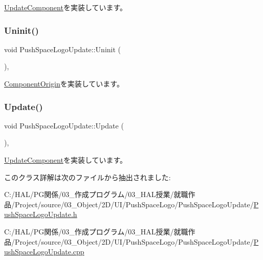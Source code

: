 \mbox{\hyperlink{class_update_component_aecc61593be4d1feff2db4d9ff1f83f9f}{Update\+Component}}を実装しています。

\mbox{\label{class_push_space_logo_update_a94f791874cb6160cd33cd7068fcde0d0}} 
\subsubsection{\texorpdfstring{Uninit()}{Uninit()}}
{\footnotesize\ttfamily void Push\+Space\+Logo\+Update\+::\+Uninit (\begin{DoxyParamCaption}{ }\end{DoxyParamCaption})\hspace{0.3cm}{\ttfamily [override]}, {\ttfamily [virtual]}}



\mbox{\hyperlink{class_component_origin_a9f89a93f9c1954bd53f9750e35e6089d}{Component\+Origin}}を実装しています。

\mbox{\label{class_push_space_logo_update_aa07fe6f6f4f072e1f81bc6708dd4727e}} 
\subsubsection{\texorpdfstring{Update()}{Update()}}
{\footnotesize\ttfamily void Push\+Space\+Logo\+Update\+::\+Update (\begin{DoxyParamCaption}{ }\end{DoxyParamCaption})\hspace{0.3cm}{\ttfamily [override]}, {\ttfamily [virtual]}}



\mbox{\hyperlink{class_update_component_ade313ad8bf19a81e7d098aa830d9f01b}{Update\+Component}}を実装しています。



このクラス詳解は次のファイルから抽出されました\+:\begin{DoxyCompactItemize}
\item 
C\+:/\+H\+A\+L/\+P\+G関係/03\+\_\+作成プログラム/03\+\_\+\+H\+A\+L授業/就職作品/\+Project/source/03\+\_\+\+Object/2\+D/\+U\+I/\+Push\+Space\+Logo/\+Push\+Space\+Logo\+Update/\mbox{\hyperlink{_push_space_logo_update_8h}{Push\+Space\+Logo\+Update.\+h}}\item 
C\+:/\+H\+A\+L/\+P\+G関係/03\+\_\+作成プログラム/03\+\_\+\+H\+A\+L授業/就職作品/\+Project/source/03\+\_\+\+Object/2\+D/\+U\+I/\+Push\+Space\+Logo/\+Push\+Space\+Logo\+Update/\mbox{\hyperlink{_push_space_logo_update_8cpp}{Push\+Space\+Logo\+Update.\+cpp}}\end{DoxyCompactItemize}
